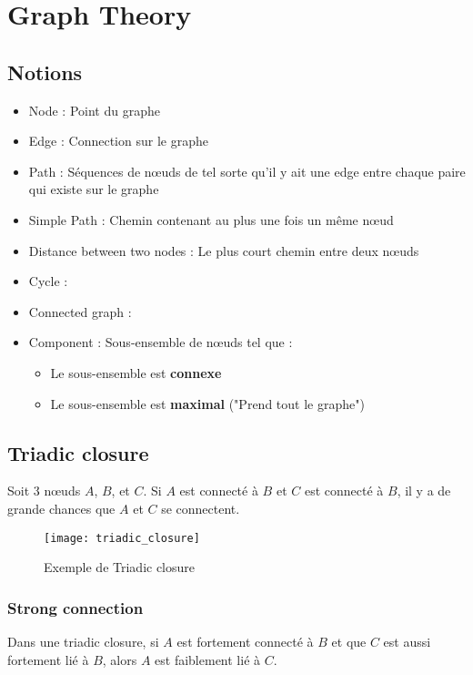 \chapter{Graph Theory}

\section{Notions}

\begin{itemize}
	\item Node : Point du graphe
	\item Edge : Connection sur le graphe
	\item Path : Séquences de nœuds de tel sorte qu'il y ait une edge entre chaque paire qui existe sur le graphe
	\item Simple Path : Chemin contenant au plus une fois un même nœud
	\item Distance between two nodes : Le plus court chemin entre deux nœuds
	\item Cycle :
	\item Connected graph :
	\item Component : Sous-ensemble de nœuds tel que :
	\begin{itemize}
		\item Le sous-ensemble est \textbf{connexe}
		\item Le sous-ensemble est \textbf{maximal} ("Prend tout le graphe")
	\end{itemize}
\end{itemize}

\section{Triadic closure}

Soit 3 nœuds $A$, $B$, et $C$. Si $A$ est connecté à $B$ et $C$ est connecté à $B$, il y a de grande chances que $A$ et $C$ se connectent.

\begin{figure}[H]
    \centering
    \texttt{[image: triadic\_closure]}
    \caption{Exemple de Triadic closure}
\end{figure}

\subsection{Strong connection}

Dans une triadic closure, si $A$ est fortement connecté à $B$ et que $C$ est aussi fortement lié à $B$, alors $A$ est faiblement lié à $C$.

